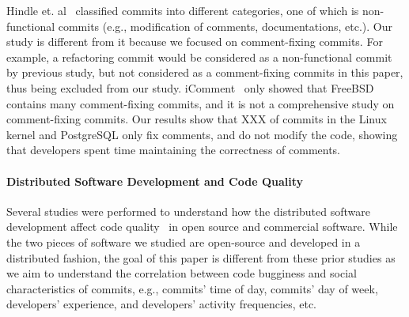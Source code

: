 Hindle et. al~\cite{largeCommits} classified commits into different categories, one of which 
is non-functional commits (e.g., modification of comments, documentations, etc.).
Our study is different from it because we focused on
comment-fixing commits. For example, a refactoring commit 
would be considered as a non-functional commit by previous study, but not considered as a comment-fixing commits in this paper, 
thus being excluded from our study. 
iComment~\cite{iComment} only showed that FreeBSD contains many comment-fixing commits, and it is 
not a comprehensive study on comment-fixing commits.  
Our results show that XXX of commits in the Linux kernel and PostgreSQL only fix comments, and do not modify the code, showing
that developers spent time maintaining the correctness of comments. 


\paragraph{Distributed Software Development and Code Quality}
Several studies were performed to understand how the distributed software development affect 
code quality~\cite{distributed09, organizational08, global06} in open source and commercial 
software. While the two pieces of software we studied are open-source and developed in a distributed fashion,  
the goal of this paper is different from these prior studies as we aim to understand the correlation
between code bugginess and social characteristics of commits, e.g., commits' time of day, commits' day 
of week, developers' experience, and developers' activity frequencies, etc. 



